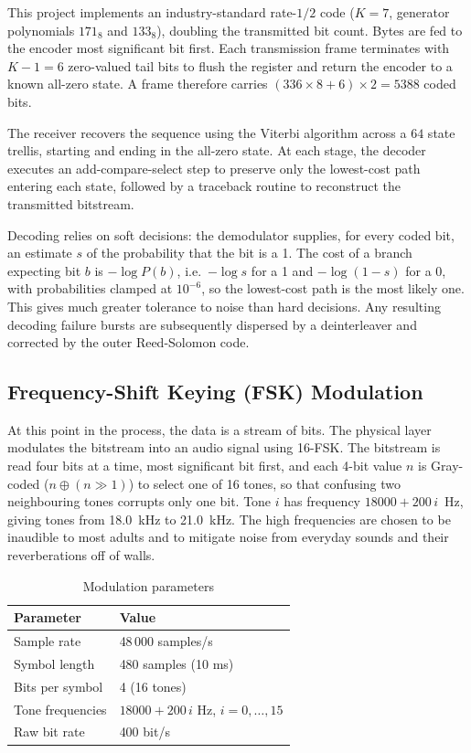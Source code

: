 \documentclass{article}
\begin{document}
This project implements an industry-standard rate-$1/2$ code ($K = 7$, generator polynomials $171_8$ and $133_8$), doubling the transmitted bit count. Bytes are fed to the encoder most significant bit first. Each transmission frame terminates with $K - 1 = 6$ zero-valued tail bits to flush the register and return the encoder to a known all-zero state. A frame therefore carries $(336 \times 8 + 6) \times 2 = 5388$ coded bits.

The receiver recovers the sequence using the Viterbi algorithm across a $64$ state trellis, starting and ending in the all-zero state. At each stage, the decoder executes an add-compare-select step to preserve only the lowest-cost path entering each state, followed by a traceback routine to reconstruct the transmitted bitstream.

Decoding relies on soft decisions: the demodulator supplies, for every coded bit, an estimate $s$ of the probability that the bit is a 1. The cost of a branch expecting bit $b$ is $-\log P(b)$, i.e.\ $-\log s$ for a 1 and $-\log(1 - s)$ for a 0, with probabilities clamped at $10^{-6}$, so the lowest-cost path is the most likely one. This gives much greater tolerance to noise than hard decisions. Any resulting decoding failure bursts are subsequently dispersed by a deinterleaver and corrected by the outer Reed-Solomon code.

\subsection{Frequency-Shift Keying (FSK) Modulation}
At this point in the process, the data is a stream of bits. The physical layer modulates the bitstream into an audio signal using 16-FSK. The bitstream is read four bits at a time, most significant bit first, and each 4-bit value $n$ is Gray-coded ($n \oplus (n \gg 1)$) to select one of 16 tones, so that confusing two neighbouring tones corrupts only one bit. Tone $i$ has frequency $18000 + 200\,i$~Hz, giving tones from 18.0~kHz to 21.0~kHz. The high frequencies are chosen to be inaudible to most adults and to mitigate noise from everyday sounds and their reverberations off of walls.

\begin{table}[H]
\centering
\begin{tabular}{ll}
\toprule
Parameter & Value \\
\midrule
Sample rate & 48\,000 samples/s \\
Symbol length & 480 samples (10 ms) \\
Bits per symbol & 4 (16 tones) \\
Tone frequencies & $18000 + 200\,i$ Hz, $i = 0, \dots, 15$ \\
Raw bit rate & 400 bit/s \\
\bottomrule
\end{tabular}
\caption{Modulation parameters}
\label{tab:modulation}
\end{table}
\end{document}

